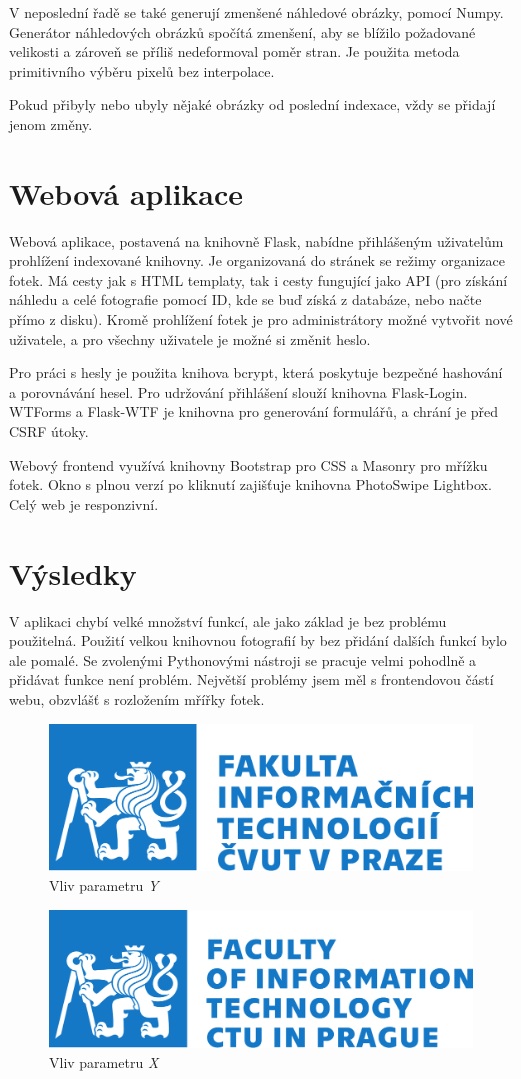 \documentclass[czech]{template/pyt-report}
\begin{document}
V neposlední řadě se také generují zmenšené náhledové obrázky, pomocí Numpy.
Generátor náhledových obrázků spočítá zmenšení, aby se blížilo požadované velikosti
a zároveň se příliš nedeformoval poměr stran. Je použita metoda primitivního 
výběru pixelů bez interpolace.

Pokud přibyly nebo ubyly nějaké obrázky od poslední indexace, vždy se přidají jenom změny.
\section{Webová aplikace}
Webová aplikace, postavená na knihovně Flask, nabídne přihlášeným uživatelům
prohlížení indexované knihovny. Je organizovaná do stránek se režimy organizace fotek.
Má cesty jak s HTML templaty, tak i cesty fungující jako API (pro získání náhledu 
a celé fotografie pomocí ID, kde se buď získá z databáze, nebo načte přímo z disku).
Kromě prohlížení fotek je pro administrátory možné vytvořit nové uživatele, a pro všechny
uživatele je možné si změnit heslo.

Pro práci s hesly je použita knihova bcrypt, která poskytuje bezpečné hashování
a porovnávání hesel. Pro udržování přihlášení slouží knihovna Flask-Login. WTForms
a Flask-WTF je knihovna pro generování formulářů, a chrání je před CSRF útoky.

Webový frontend využívá knihovny Bootstrap pro CSS a Masonry pro mřížku fotek.
Okno s plnou verzí po kliknutí zajišťuje knihovna PhotoSwipe Lightbox.
Celý web je responzivní.
\section{Výsledky}
V aplikaci chybí velké množství funkcí, ale jako základ je bez problému použitelná.
Použití velkou knihovnou fotografií by bez přidání dalších funkcí bylo ale pomalé.
Se zvolenými Pythonovými nástroji se pracuje velmi pohodlně a přidávat funkce není problém.
Největší problémy jsem měl s frontendovou částí webu, obzvlášť s rozložením mřířky fotek.

\begin{figure}[h]
  \centering\leavevmode
  \includegraphics[width=.45\linewidth]{template/img/fit-logo-cz.pdf}\vskip-0.5cm
  \caption{Vliv parametru \emph{Y}}
  \label{fig:par-y}
\end{figure}
\begin{figure}[h]
  \centering\leavevmode
  \includegraphics[width=.45\linewidth]{template/img/fit-logo-en.pdf}\vskip-0.5cm
  \caption{Vliv parametru \emph{X}}
  \label{fig:par-x}
\end{figure}
\end{document}
